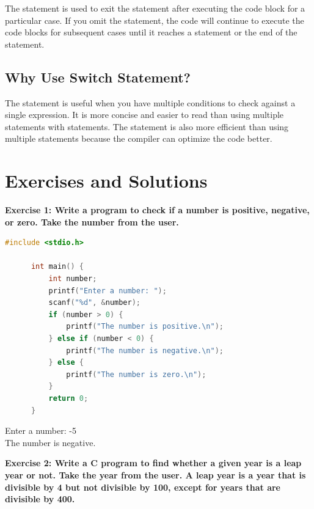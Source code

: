 \documentclass[12pt, openany]{book}
\begin{document}
  \begin{infobox}
      The  statement is used to exit the  statement after executing the code block for a particular case. If you omit the  statement, the code will continue to execute the code blocks for subsequent cases until it reaches a  statement or the end of the  statement.
  \end{infobox}
  
  \subsection{Why Use Switch Statement?}
  The  statement is useful when you have multiple conditions to check against a single expression. It is more concise and easier to read than using multiple  statements with  statements. The  statement is also more efficient than using multiple  statements because the compiler can optimize the code better.
  
  \section{Exercises and Solutions}
  \textbf{Exercise 1: Write a program to check if a number is positive, negative, or zero. Take the number from the user.}
  
  \begin{lstlisting}[language=C, caption=Solution to Exercise 1]
      #include <stdio.h>
      
      int main() {
          int number;
          printf("Enter a number: ");
          scanf("%d", &number);
          if (number > 0) {
              printf("The number is positive.\n");
          } else if (number < 0) {
              printf("The number is negative.\n");
          } else {
              printf("The number is zero.\n");
          }
          return 0;
      }
  \end{lstlisting}
  \begin{tcolorbox}[colback=lightgray!10, colframe=black, title=Output]
      Enter a number: -5 \\
      The number is negative.
  \end{tcolorbox}
  \vspace{10pt}
  \noindent\textbf{Exercise 2: Write a C program to find whether a given year is a leap year or not. Take the year from the user. A leap year is a year that is divisible by 4 but not divisible by 100, except for years that are divisible by 400.}
  
\end{document}
